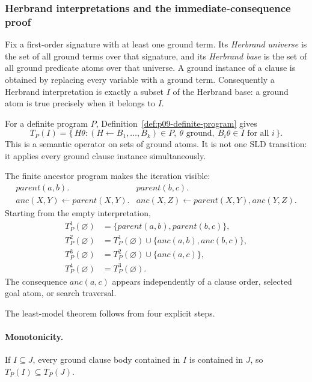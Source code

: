 \subsubsection{Herbrand interpretations and the immediate-consequence proof}

Fix a first-order signature with at least one ground term.  Its \emph{Herbrand
universe} is the set of all ground terms over that signature, and its
\emph{Herbrand base} is the set of all ground predicate atoms over that
universe.  A ground instance of a clause is obtained by replacing every
variable with a ground term.  Consequently a Herbrand interpretation is exactly
a subset \(I\) of the Herbrand base: a ground atom is true precisely when it
belongs to \(I\).

For a definite program \(P\), Definition~\ref{def:p09-definite-program} gives
\[
 T_P(I)=
 \{\,H\theta:
   (H\leftarrow B_1,\ldots,B_k)\in P,\ 
   \theta\text{ ground},\
   B_i\theta\in I\text{ for all }i\,\}.
\]
This is a semantic operator on sets of ground atoms.  It is not one SLD
transition: it applies every ground clause instance simultaneously.

The finite ancestor program makes the iteration visible:
\[
\begin{array}{ll}
 parent(a,b).&parent(b,c).\\
 anc(X,Y)\leftarrow parent(X,Y).&
 anc(X,Z)\leftarrow parent(X,Y),anc(Y,Z).
\end{array}
\]
Starting from the empty interpretation,
\[
\begin{aligned}
 T_P^1(\varnothing)
   &=\{parent(a,b),parent(b,c)\},\\
 T_P^2(\varnothing)
   &=T_P^1(\varnothing)
     \cup\{anc(a,b),anc(b,c)\},\\
 T_P^3(\varnothing)
   &=T_P^2(\varnothing)\cup\{anc(a,c)\},\\
 T_P^4(\varnothing)&=T_P^3(\varnothing).
\end{aligned}
\]
The consequence \(anc(a,c)\) appears independently of a clause order, selected
goal atom, or search traversal.

The least-model theorem follows from four explicit steps.

\paragraph{Monotonicity.}
If \(I\subseteq J\), every ground clause body contained in \(I\) is contained
in \(J\), so \(T_P(I)\subseteq T_P(J)\).

